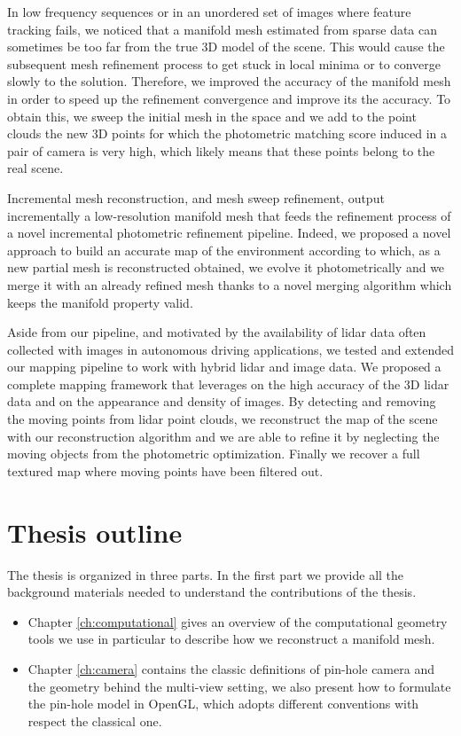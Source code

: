 In low frequency sequences or in an unordered set of images where feature tracking fails, we noticed that a manifold mesh estimated from sparse data can sometimes be too far from the true 3D model of the scene. This would cause the subsequent mesh refinement process to get stuck in local minima or to converge slowly to the solution. Therefore, we improved the accuracy of the manifold mesh in order to speed up the refinement convergence and improve its the accuracy. To obtain this, we sweep the initial mesh in the space and we add to the point clouds the new 3D points for which the photometric matching score induced in a pair of camera is very high, which likely means that these points belong to the real scene.

Incremental mesh reconstruction, and mesh sweep refinement, output incrementally a low-resolution manifold mesh that feeds the refinement process of a novel incremental photometric refinement pipeline. Indeed, we proposed a novel approach to build an accurate map of the environment according to which, as a new partial mesh is reconstructed obtained, we evolve it photometrically and we merge it with an already refined mesh thanks to a novel merging algorithm which keeps the manifold property valid.

Aside from our pipeline, and motivated by the availability of lidar data often collected with images in autonomous driving applications, we tested and extended our mapping pipeline to work with hybrid lidar and image data. We proposed a complete mapping framework that leverages on the high accuracy of the 3D lidar data and on the appearance and density of images. By detecting and removing the moving points from lidar point clouds, we reconstruct the map of the scene with our reconstruction algorithm and we are able to refine it by neglecting the moving objects from the photometric optimization. Finally we recover a full textured map where moving points have been filtered out.

\section{Thesis outline}

The thesis is organized in three parts. 
In the first part we provide all the background materials needed to understand the contributions of the thesis.
\begin{itemize}
 \item Chapter \ref{ch:computational} gives an overview of the computational geometry tools we use in particular to describe how we reconstruct a manifold mesh.
 \item Chapter \ref{ch:camera} contains the classic definitions of pin-hole camera and the geometry behind the  multi-view setting, we also present how to formulate the pin-hole model in OpenGL, which adopts different conventions with respect the classical one.
\end{itemize}



